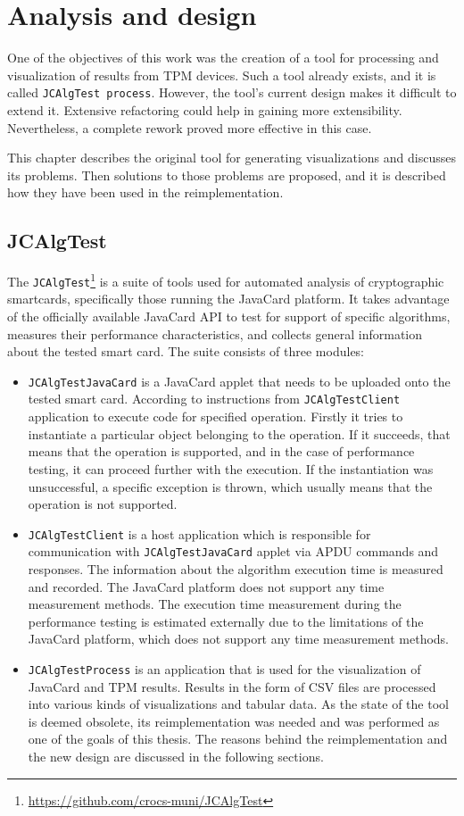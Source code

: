\chapter{Analysis and design}
One of the objectives of this work was the creation of a tool for processing and visualization of results from TPM devices. Such a tool already exists, and it is called \texttt{JCAlgTest process}. However, the tool's current design makes it difficult to extend it. Extensive refactoring could help in gaining more extensibility. Nevertheless, a complete rework proved more effective in this case.

This chapter describes the original tool for generating visualizations and discusses its problems. Then solutions to those problems are proposed, and it is described how they have been used in the reimplementation.

\section{JCAlgTest}\label{sec:jcalgtest}
The \texttt{JCAlgTest}\footnote{\url{https://github.com/crocs-muni/JCAlgTest}} is a suite of tools used for automated analysis of cryptographic smartcards, specifically those running the JavaCard platform. It takes advantage of the officially available JavaCard API to test for support of specific algorithms, measures their performance characteristics, and collects general information about the tested smart card. The suite consists of three modules:
\begin{itemize}
  \item
        \texttt{JCAlgTestJavaCard} is a JavaCard applet that needs to be uploaded onto the tested smart card. According to instructions from \texttt{JCAlgTestClient} application to execute code for specified operation. Firstly it tries to instantiate a particular object belonging to the operation. If it succeeds, that means that the operation is supported, and in the case of performance testing, it can proceed further with the execution. If the instantiation was unsuccessful, a specific exception is thrown, which usually means that the operation is not supported.
  \item
        \texttt{JCAlgTestClient} is a host application which is responsible for communication with \texttt{JCAlgTestJavaCard} applet via APDU commands and responses. The information about the algorithm execution time is measured and recorded. The JavaCard platform does not support any time measurement methods. The execution time measurement during the performance testing is estimated externally due to the limitations of the JavaCard platform, which does not support any time measurement methods. 
  \item
        \texttt{JCAlgTestProcess} is an application that is used for the visualization of JavaCard and TPM results. Results in the form of CSV files are processed into various kinds of visualizations and tabular data. As the state of the tool is deemed obsolete, its reimplementation was needed and was performed as one of the goals of this thesis. The reasons behind the reimplementation and the new design are discussed in the following sections.
\end{itemize}

